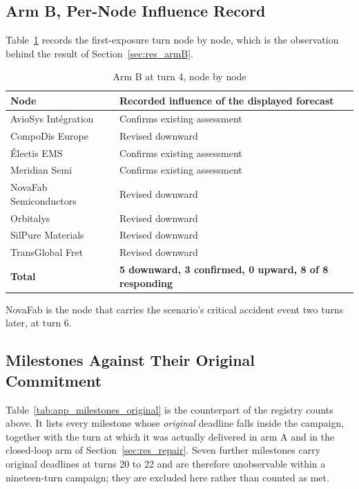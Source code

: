 \subsection*{Arm B, Per-Node Influence Record}

Table~\ref{tab:app_armB_t4} records the first-exposure turn node by node, which is the
observation behind the result of Section~\ref{sec:res_armB}.

\begin{table}[htbp]
\centering
\caption{Arm B at turn 4, node by node}
\label{tab:app_armB_t4}
\small
\begin{tabularx}{\linewidth}{>{\raggedright\arraybackslash}p{5.0cm} X}
\toprule
\textbf{Node} & \textbf{Recorded influence of the displayed forecast} \\
\midrule
AvioSys Int\'egration & Confirms existing assessment \\
CompoDis Europe & Revised downward \\
\'Electis EMS & Confirms existing assessment \\
Meridian Semi & Confirms existing assessment \\
NovaFab Semiconductors & Revised downward \\
Orbitalys & Revised downward \\
SilPure Materials & Revised downward \\
TransGlobal Fret & Revised downward \\
\midrule
\textbf{Total} & \textbf{5 downward, 3 confirmed, 0 upward, 8 of 8 responding} \\
\bottomrule
\end{tabularx}
\end{table}

NovaFab is the node that carries the scenario's critical accident event two turns later, at
turn 6.

\subsection*{Milestones Against Their Original Commitment}
\label{app:milestones_original}

Table~\ref{tab:app_milestones_original} is the counterpart of the registry counts above. It
lists every milestone whose \emph{original} deadline falls inside the campaign, together with
the turn at which it was actually delivered in arm A and in the closed-loop arm of
Section~\ref{sec:res_repair}. Seven further milestones carry original deadlines at turns 20
to 22 and are therefore unobservable within a nineteen-turn campaign; they are excluded here
rather than counted as met.

